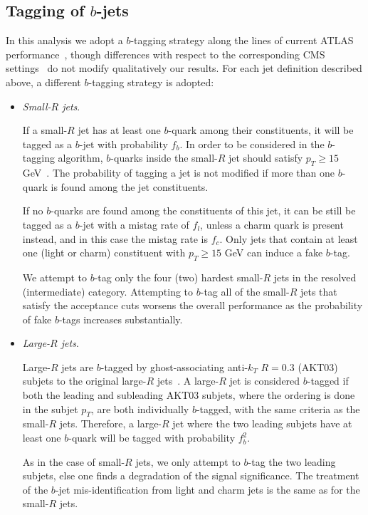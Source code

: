 


\subsection{Tagging of $b$-jets}
\label{sec:btagging}

In this analysis we adopt
a $b$-tagging strategy along the lines
of current ATLAS performance~\cite{Aad:2013gja,Aad:2015ydr},
though differences with respect to
the corresponding CMS
settings~\cite{Khachatryan:2011wq,Chatrchyan:2012jua}
do not modify qualitatively our results.
%
For each jet definition described above, a different
$b$-tagging strategy is adopted:

\begin{itemize}

\item {\it Small-$R$ jets}.

  If a small-$R$ jet has at least one $b$-quark among their constituents,
  it will be tagged as a $b$-jet with probability $f_b$.
  In order to be considered in the $b$-tagging algorithm,
  $b$-quarks inside the small-$R$ jet
  should satisfy $p_T \ge 15$ GeV~\cite{Aad:2015ydr}.
  The probability of tagging a jet is not modified
  if more than one $b$-quark is found among the jet constituents.


  
  If no $b$-quarks are found among the constituents
  of this jet, it can be still be tagged as a $b$-jet with
  a mistag rate of $f_l$, unless a charm quark is present instead,
  and in this case the mistag rate is $f_c$.
  Only jets that contain at least one (light or charm)
  constituent
  with $p_T \ge 15$ GeV can induce a fake $b$-tag.

  
  We attempt to $b$-tag only the four (two) hardest small-$R$ jets
  in the resolved (intermediate) category.
  Attempting to $b$-tag all of the
  small-$R$ jets that satisfy the acceptance cuts worsens the
  overall performance as the probability of fake $b$-tags increases
  substantially.

  \item {\it Large-$R$ jets}.

    Large-$R$ jets are $b$-tagged by
    ghost-associating anti-$k_T$ $R=0.3$ (AKT03)
    subjets to the original large-$R$
    jets~\cite{Cacciari:2007fd,Aad:2013gja,
      ATLAS-CONF-2014-004,Aad:2015uka}.
    A large-$R$ jet is considered $b$-tagged if both
    the leading and subleading AKT03 subjets, where the ordering
    is done in the subjet $p_T$, are both individually $b$-tagged,
    with the same criteria as the small-$R$ jets.
     Therefore, a large-$R$ jet where the two leading
    subjets have at least one $b$-quark will be tagged
    with probability $f_b^2$.
    
    As in the case
    of small-$R$ jets, we only attempt to $b$-tag the two leading subjets,
    else one finds a degradation of the
    signal significance.
    The treatment of the $b$-jet mis-identification
    from light and charm jets
    is the same as for the small-$R$ jets.
  
\end{itemize}

